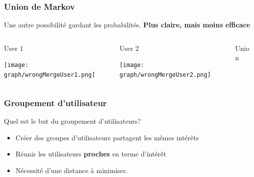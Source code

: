 \documentclass{beamer}
\begin{document}
            \begin{frame}
                \frametitle{Union de Markov}
                Une autre possibilité gardant les probabilités. \pause[5] \textbf{Plus claire, mais moins efficace}
                \pause[2]
                \begin{columns}[t]
                    \begin{column}{3cm}
                        \begin{exampleblock}{User 1}
                            \begin{center}
                                \texttt{[image: graph/wrongMergeUser1.png]}
                            \end{center}
                        \end{exampleblock}
                    \end{column}
                    \begin{column}{3cm}
                        \begin{exampleblock}{User 2}
                            \begin{center}
                                \texttt{[image: graph/wrongMergeUser2.png]}
                            \end{center}
                        \end{exampleblock}
                    \end{column}
                    \pause[3]
                    \begin{column}{3cm}
                        \begin{exampleblock}{Union}
                            \begin{center}
                                \pause[4]
                            \end{center}
                        \end{exampleblock}
                    \end{column}
                \end{columns}
            \end{frame}
            \begin{frame}
                \frametitle{Groupement d'utilisateur}
                Quel est le but du groupement d'utilisateurs?
                \pause
                \begin{itemize}
                    \item Créer des groupes d'utilisateurs partagent les mêmes intérêts
                    \pause
                    \item Réunir les utilisateurs \textbf{proches} en terme d'intérêt
                    \pause
                    \item Nécessité d'une distance à minimiser.
                \end{itemize}
            \end{frame}
\end{document}
